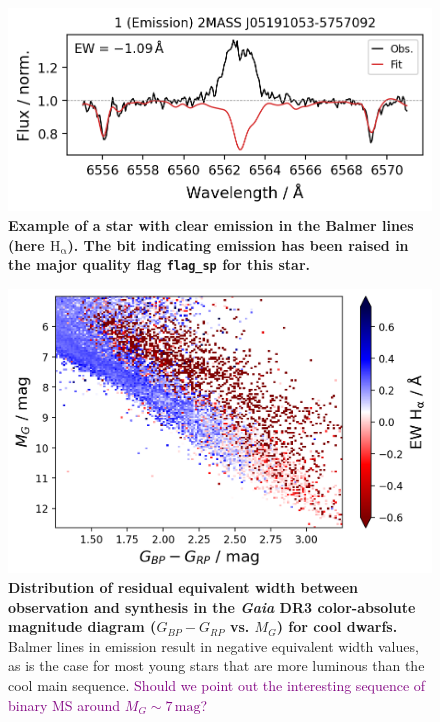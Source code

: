 \documentclass[
  journal=pasa,
  manuscript=research-paper, %
  year=2023,
  volume=37
]{cup-journal}
\newcommand{\SB}[1]{{\textcolor{purple}{#1}}}
\newcommand{\Gaia}{\textit{Gaia}\xspace}
\begin{document}
\begin{figure}[ht]
 \centering
 \includegraphics[width=\textwidth]{figures/examples_flag_sp_1.png}
 \caption{\textbf{Example of a star with clear emission in the Balmer lines (here $\mathrm{H_{\alpha}}$). The bit indicating emission has been raised in the major quality flag \texttt{flag\_sp} for this star.}} \label{fig:examples_flag_sp_1}
\end{figure}

\begin{figure}[ht]
 \centering
 \includegraphics[width=\textwidth]{figures/emission_young_stars.png}
 \caption{\textbf{Distribution of residual equivalent width between observation and synthesis in the \Gaia DR3 color-absolute magnitude diagram ($G_{BP}-G_{RP}$ vs. $M_G$) for cool dwarfs.} Balmer lines in emission result in negative equivalent width values, as is the case for most young stars that are more luminous than the cool main sequence. \SB{Should we point out the interesting sequence of binary MS around $M_G \sim 7\,\mathrm{mag}$?}} \label{fig:emission_young_stars.png}
\end{figure}
\end{document}
